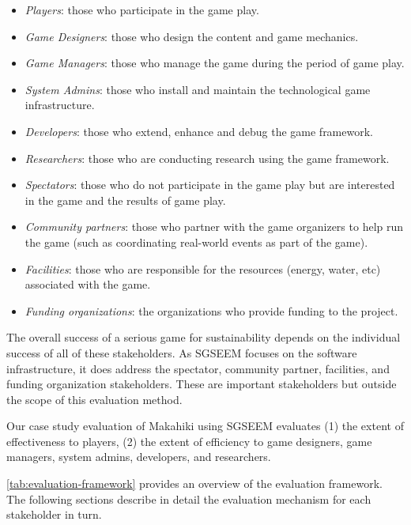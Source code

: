 \documentclass{sigchi}
\begin{document}
\begin{itemize}
\item \emph{Players}: those who participate in the game play.
\item \emph{Game Designers}: those who design the content and game mechanics.
 \item \emph{Game Managers}: those who manage the game during the period of game play.
\item \emph{System Admins}: those who install and maintain the technological game infrastructure.
\item \emph{Developers}: those who extend, enhance and debug the game framework.
\item \emph{Researchers}: those who are conducting research using the game framework.
\item \emph{Spectators}: those who do not participate in the game
  play but are interested in the game and the results of game play.
\item \emph{Community partners}: those who partner
  with the game organizers to help run the game (such as coordinating real-world events as part of the game).
\item \emph{Facilities}: those who are responsible for the resources (energy, water, etc)
  associated with the game.
\item \emph{Funding organizations}: the organizations who provide
  funding to the project.
\end{itemize}

The overall success of a serious game for sustainability depends on the individual success
of all of these stakeholders. As SGSEEM focuses on the software infrastructure, it does 
address the spectator, community partner, facilities, and funding
organization stakeholders.  These are important stakeholders but outside the scope of this evaluation
method.

Our case study evaluation of Makahiki using SGSEEM evaluates (1) the extent of
effectiveness to players, (2) the extent of efficiency to game designers, game managers,
system admins, developers, and researchers.

\autoref{tab:evaluation-framework} provides an overview of the evaluation framework. The
following sections describe in detail the evaluation mechanism for each stakeholder in
turn.
\end{document}
